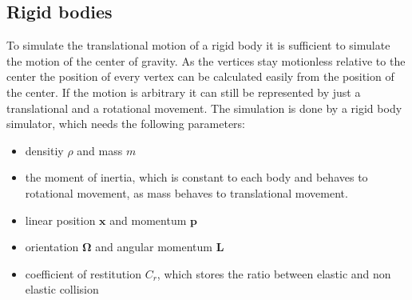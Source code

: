 \subsection{Rigid bodies}
	\cite{lecRigidBodies} To simulate the translational motion of a rigid body it is sufficient to simulate the motion of the center of gravity. As the vertices stay motionless relative to the center the position of every vertex can be calculated easily from the position of the center. 
	If the motion is arbitrary it can still be represented by just a translational and a rotational movement. 
	The simulation is done by a rigid body simulator, which needs the following parameters:
	\begin{itemize}
		\item densitiy $\rho$ and mass $m$
		\item the moment of inertia, which is constant to each body and behaves to rotational movement, as mass behaves to translational movement.
		\item linear position $\bm{x}$ and momentum $\bm{p}$
		\item orientation $\bm \Omega$ and angular momentum $\bm L$
		\item coefficient of restitution $C_r$, which stores the ratio between elastic and non elastic collision
	\end{itemize}
	
